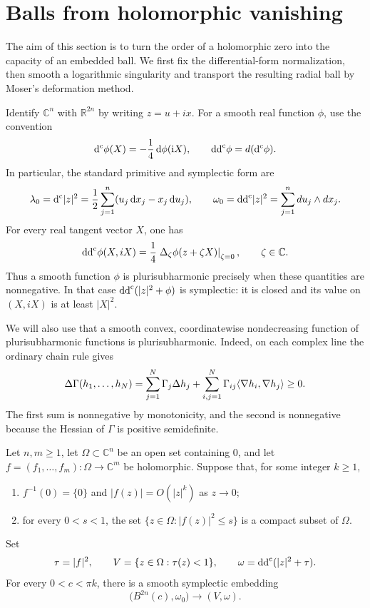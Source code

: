 \section{Balls from holomorphic vanishing}
\label{sec:ball}

The aim of this section is to turn the order of a holomorphic zero into the capacity of an embedded ball. We first fix the differential-form normalization, then smooth a logarithmic singularity and transport the resulting radial ball by Moser's deformation method.

Identify $\mathbb{C}^n$ with $\mathbb{R}^{2n}$ by writing $z=u+ix$.  For a smooth real function $\phi$, use the convention
\[
 \mathrm{d}^{\mathrm{c}}\phi(X)=-\frac14\,\mathrm{d} \phi(\mathrm{i} X),
 \qquad \mathrm{dd}^{\mathrm{c}}\phi=d(\mathrm{d}^{\mathrm{c}}\phi).
\]
In particular, the standard primitive and symplectic form are
\begin{equation}
 \lambda_0=\mathrm{d}^{\mathrm{c}}|z|^2
   =\frac12\sum_{j=1}^n(u_j\,\mathrm{d} x_j-x_j\,\mathrm{d} u_j),
 \qquad
 \omega_0=\mathrm{dd}^{\mathrm{c}}|z|^2=\sum_{j=1}^n du_j\wedge dx_j.
 \label{eq:ball-normalization}
\end{equation}
For every real tangent vector $X$, one has
\[
 \mathrm{dd}^{\mathrm{c}}\phi(X,iX)
 =\frac14\left.\Delta_{\zeta}\phi(z+\zeta X)\right|_{\zeta=0},
 \qquad \zeta\in\mathbb{C}.
\]
Thus a smooth function $\phi$ is plurisubharmonic precisely when these quantities are nonnegative.  In that case $\mathrm{dd}^{\mathrm{c}}(|z|^2+\phi)$ is symplectic: it is closed and its value on $(X,iX)$ is at least $|X|^2$.

We will also use that a smooth convex, coordinatewise nondecreasing function of plurisubharmonic functions is plurisubharmonic.  Indeed, on each complex line the ordinary chain rule gives
\[
 \Delta\Gamma(h_1,\ldots,h_N)
 =\sum_{j=1}^N\Gamma_j\Delta h_j
   +\sum_{i,j=1}^N\Gamma_{ij}
        \langle \nabla h_i,\nabla h_j\rangle\ge0.
\]
The first sum is nonnegative by monotonicity, and the second is nonnegative because the Hessian of $\Gamma$ is positive semidefinite.

\begin{theorem}
\label{thm:holomorphic-ball}
Let $n,m\ge1$, let $\Omega\subset\mathbb{C}^n$ be an open set containing $0$, and let $f=(f_1,\ldots,f_m):\Omega\to\mathbb{C}^m$ be holomorphic.  Suppose that, for some integer $k\ge1$,
\begin{enumerate}[label=\textup{(\roman*)}]
 \item $f^{-1}(0)=\{0\}$ and $|f(z)|=O(|z|^k)$ as $z\to0$;
 \item for every $0<s<1$, the set
 $\{z\in\Omega:|f(z)|^2\le s\}$ is a compact subset of $\Omega$.
\end{enumerate}
Set
\[
 \tau=|f|^2,\qquad V=\{z\in\Omega:\tau(z)<1\},
 \qquad \omega=\mathrm{dd}^{\mathrm{c}}(|z|^2+\tau).
\]
For every $0<c<\pi k$, there is a smooth symplectic embedding
\[
 \bigl(B^{2n}(c),\omega_0\bigr)\longrightarrow(V,\omega).
\]
\end{theorem}

